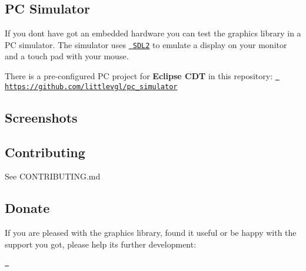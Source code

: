 \subsection*{PC Simulator}

If you don\textquotesingle{}t have got an embedded hardware you can test the graphics library in a PC simulator. The simulator uses \href{https://www.libsdl.org/}{\texttt{ S\+D\+L2}} to emulate a display on your monitor and a touch pad with your mouse.

There is a pre-\/configured PC project for {\bfseries{Eclipse C\+DT}} in this repository\+: \href{https://github.com/littlevgl/pc_simulator}{\texttt{ https\+://github.\+com/littlevgl/pc\+\_\+simulator}}

\subsection*{Screenshots}

   

\subsection*{Contributing}

See C\+O\+N\+T\+R\+I\+B\+U\+T\+I\+NG.md

\subsection*{Donate}

If you are pleased with the graphics library, found it useful or be happy with the support you got, please help its further development\+:

\href{https://littlevgl.com/donate}{\texttt{ }} 